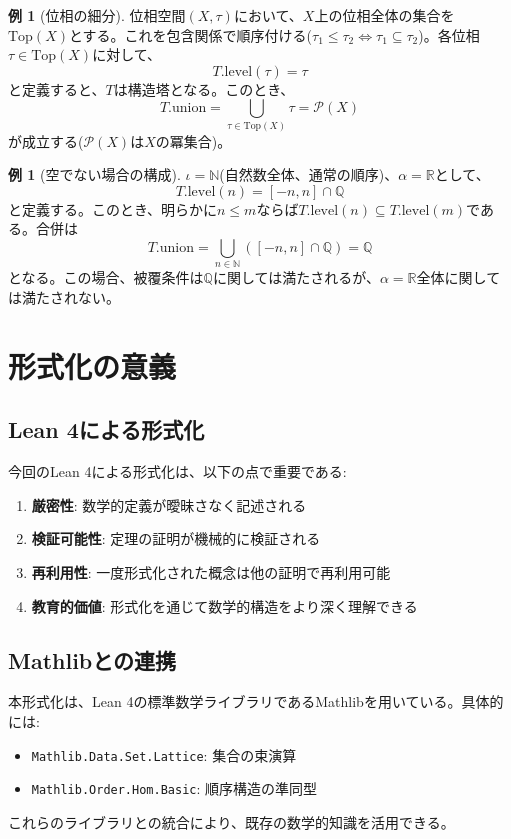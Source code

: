 \documentclass[a4paper,12pt]{article}
\theoremstyle{definition}
\newtheorem{example}[definition]{例}
\begin{document}
\begin{example}[位相の細分]
位相空間$(X, \tau)$において、$X$上の位相全体の集合を$\text{Top}(X)$とする。これを包含関係で順序付ける($\tau_1 \leq \tau_2 \Leftrightarrow \tau_1 \subseteq \tau_2$)。各位相$\tau \in \text{Top}(X)$に対して、
\[
T.\text{level}(\tau) = \tau
\]
と定義すると、$T$は構造塔となる。このとき、
\[
T.\text{union} = \bigcup_{\tau \in \text{Top}(X)} \tau = \mathcal{P}(X)
\]
が成立する($\mathcal{P}(X)$は$X$の冪集合)。
\end{example}

\begin{example}[空でない場合の構成]
$\iota = \mathbb{N}$(自然数全体、通常の順序)、$\alpha = \mathbb{R}$として、
\[
T.\text{level}(n) = [-n, n] \cap \mathbb{Q}
\]
と定義する。このとき、明らかに$n \leq m$ならば$T.\text{level}(n) \subseteq T.\text{level}(m)$である。合併は
\[
T.\text{union} = \bigcup_{n \in \mathbb{N}} ([-n, n] \cap \mathbb{Q}) = \mathbb{Q}
\]
となる。この場合、被覆条件は$\mathbb{Q}$に関しては満たされるが、$\alpha = \mathbb{R}$全体に関しては満たされない。
\end{example}

\section{形式化の意義}

\subsection{Lean 4による形式化}

今回のLean 4による形式化は、以下の点で重要である:

\begin{enumerate}
\item \textbf{厳密性}: 数学的定義が曖昧さなく記述される
\item \textbf{検証可能性}: 定理の証明が機械的に検証される
\item \textbf{再利用性}: 一度形式化された概念は他の証明で再利用可能
\item \textbf{教育的価値}: 形式化を通じて数学的構造をより深く理解できる
\end{enumerate}

\subsection{Mathlibとの連携}

本形式化は、Lean 4の標準数学ライブラリであるMathlibを用いている。具体的には:
\begin{itemize}
\item \texttt{Mathlib.Data.Set.Lattice}: 集合の束演算
\item \texttt{Mathlib.Order.Hom.Basic}: 順序構造の準同型
\end{itemize}
これらのライブラリとの統合により、既存の数学的知識を活用できる。
\end{document}

